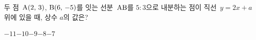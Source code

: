 두 점~$\mathrm{A}(2,\mkern3mu 3)$, $\mathrm{B}(6,\mkern3mu -5)$를 잇는 선분~$\mathrm{AB}$를 $5:3$으로 내분하는 점이 직선~$y=2x+a$ 위에 있을 때, 상수 $a$의 값은?
\begin{choices32}{$-11$}{$-10$}{$-9$}{$-8$}{$-7$}\end{choices32}

